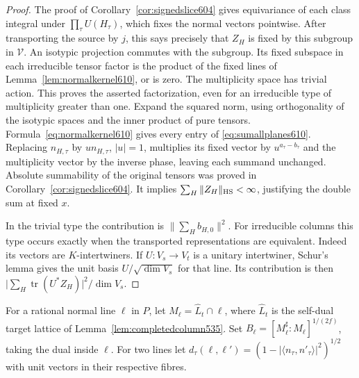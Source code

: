\documentclass[a4paper,11pt]{article}
\theoremstyle{definition}
\theoremstyle{remark}
\numberwithin{equation}{section}
\begin{document}
\begin{proof}
The proof of Corollary~\ref{cor:signedslice604} gives
equivariance of each class integral under \(\prod_\tau U(H_\tau)\),
which fixes the normal vectors pointwise. After transporting the
source by \(j\), this says precisely that \(Z_H\) is fixed by this
subgroup in \(\mathcal V\). An isotypic projection commutes with
the subgroup. Its fixed subspace in each irreducible tensor factor
is the product of the fixed lines of Lemma~\ref{lem:normalkernel610},
or is zero. The multiplicity space has trivial action. This proves
the asserted factorization, even for an irreducible type of
multiplicity greater than one. Expand the squared norm, using
orthogonality of the isotypic spaces and the inner product of
pure tensors. Formula~\eqref{eq:normalkernel610} gives every entry
of \eqref{eq:sumallplanes610}. Replacing \(n_{H,\tau}\) by
\(u n_{H,\tau}\), \(|u|=1\), multiplies its fixed vector by
\(u^{a_\tau-b_\tau}\) and the multiplicity vector by the inverse
phase, leaving each summand unchanged. Absolute summability of
the original tensors was proved in Corollary~\ref{cor:signedslice604}.
It implies \(\sum_H\|Z_H\|_{\rm HS}<\infty\), justifying the
double sum at fixed \(x\).

In the trivial type the contribution is
\(\|\sum_H b_{H,0}\|^2\). For irreducible columns this type occurs
exactly when the transported representations are equivalent.
Indeed its vectors are \(K\)-intertwiners. If \(U:V_s\to V_t\)
is a unitary intertwiner, Schur's lemma gives the unit basis
\(U/\sqrt{\dim V_s}\) for that line. Its contribution is then
\(\big|\sum_H\operatorname{tr}(U^*Z_H)\big|^2/\dim V_s\).
\end{proof}

For a rational normal line \(\ell\) in \(P\), let
\(M_\ell=\widehat L_t\cap\ell\), where \(\widehat L_t\) is the
self-dual target lattice of Lemma~\ref{lem:completedcolumn535}.
Set \(B_\ell=[M_\ell^\sharp:M_\ell]^{1/(2f)}\), taking the dual
inside \(\ell\). For two lines let
\(d_\tau(\ell,\ell')=(1-|\langle n_\tau,n'_\tau\rangle|^2)^{1/2}\)
with unit vectors in their respective fibres.
\end{document}
